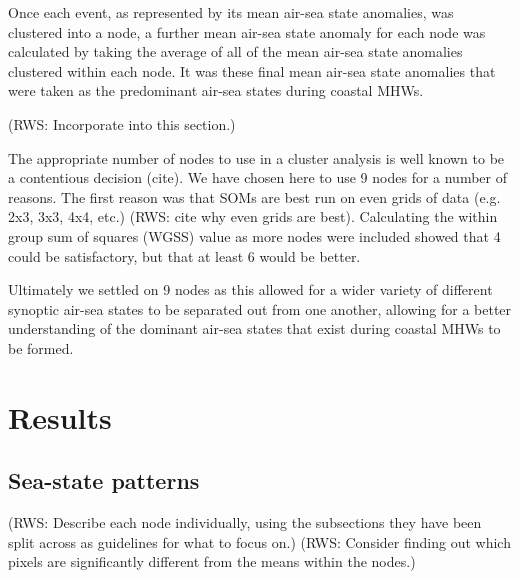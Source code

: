 \documentclass[a4paper,10pt,review]{elsarticle}
\begin{document}
Once each event, as represented by its mean air-sea state anomalies, was clustered into a node, a further mean air-sea state anomaly for each node was calculated by taking the average of all of the mean air-sea state anomalies clustered within each node. It was these final mean air-sea state anomalies that were taken as the predominant air-sea states during coastal MHWs.

(RWS: Incorporate into this section.)

The appropriate number of nodes to use in a cluster analysis is well known to be a contentious decision (cite). We have chosen here to use 9 nodes for a number of reasons. The first reason was that SOMs are best run on even grids of data (e.g. 2x3, 3x3, 4x4, etc.) (RWS: cite why even grids are best). Calculating the within group sum of squares (WGSS) value as more nodes were included showed that 4 could be satisfactory, but that at least 6 would be better. 

Ultimately we settled on 9 nodes as this allowed for a wider variety of different synoptic air-sea states to be separated out from one another, allowing for a better understanding of the dominant air-sea states that exist during coastal MHWs to be formed. 


\section{Results}


\subsection{Sea-state patterns}

(RWS: Describe each node individually, using the subsections they have been split across as guidelines for what to focus on.)
(RWS: Consider finding out which pixels are significantly different from the means within the nodes.)
\end{document}
